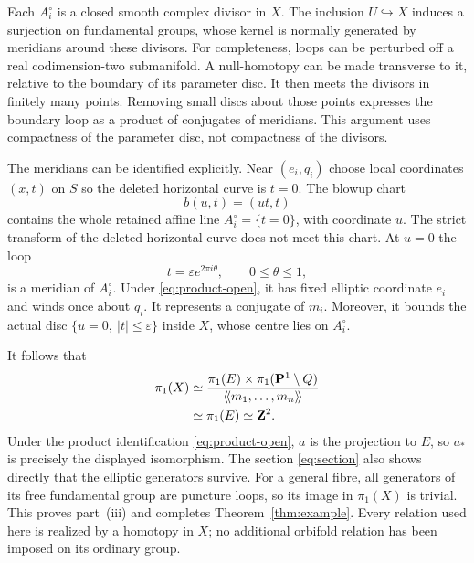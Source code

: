 Each $A_i^\circ$ is a closed smooth complex divisor in $X$. The inclusion
$U\hookrightarrow X$ induces a surjection on fundamental groups, whose
kernel is normally generated by meridians around these divisors. For
completeness, loops can be perturbed off a real codimension-two
submanifold. A null-homotopy can be made transverse to it, relative to
the boundary of its parameter disc. It then meets the divisors in
finitely many points. Removing small discs about those points expresses
the boundary loop as a product of conjugates of meridians. This argument
uses compactness of the parameter disc, not compactness of the divisors.

The meridians can be identified explicitly. Near $(e_i,q_i)$ choose local
coordinates $(x,t)$ on $S$ so the deleted horizontal curve is $t=0$.
The blowup chart
\begin{equation}\label{eq:blowup-chart}
 b(u,t)=(ut,t)
\end{equation}
contains the whole retained affine line $A_i^\circ=\{t=0\}$, with
coordinate $u$. The strict transform of the deleted horizontal curve
does not meet this chart. At $u=0$ the loop
\[
 t=\varepsilon e^{2\pi i\theta},\qquad0\leq\theta\leq1,
\]
is a meridian of $A_i^\circ$. Under \eqref{eq:product-open}, it has fixed
elliptic coordinate $e_i$ and winds once about $q_i$. It represents a
conjugate of $m_i$. Moreover, it bounds the actual disc
$\{u=0,\ |t|\leq\varepsilon\}$ inside $X$, whose centre lies on
$A_i^\circ$.

It follows that
\begin{align*}
 \pi_1(X)
 &\simeq
 \frac{\pi_1(E)\times\pi_1(\mathbf P^1\setminus Q)}
      {\langle\!\langle m_1,\ldots,m_n\rangle\!\rangle}\\
 &\simeq\pi_1(E)\simeq\mathbf Z^2.
\end{align*}
Under the product identification \eqref{eq:product-open}, $a$ is the
projection to $E$, so $a_*$ is precisely the displayed isomorphism. The
section \eqref{eq:section} also shows directly that the elliptic
generators survive. For a general fibre, all generators of its free
fundamental group are puncture loops, so its image in $\pi_1(X)$ is trivial. This
proves part~(iii) and completes Theorem~\ref{thm:example}. Every relation
used here is realized by a homotopy in $X$; no additional orbifold
relation has been imposed on its ordinary group.
